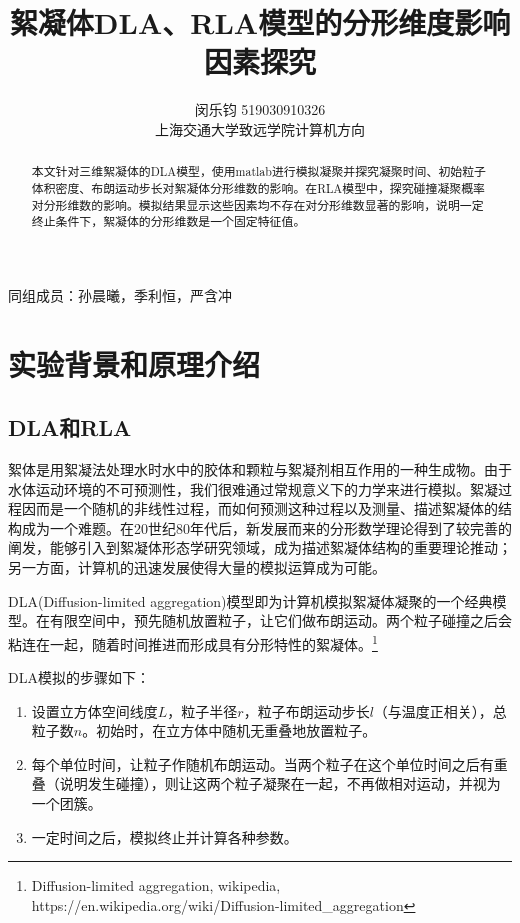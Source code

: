 \documentclass[lang=cn,11pt,a4paper,cite=authoryear]{elegantpaper}
\title{絮凝体DLA、RLA模型的分形维度影响因素探究}
\author{闵乐钧 519030910326\\ 上海交通大学致远学院计算机方向}
\date{\zhtoday}
\begin{document}
\maketitle

\begin{center}
    同组成员：孙晨曦，季利恒，严含冲
\end{center}

\begin{abstract}
本文针对三维絮凝体的DLA模型，使用matlab进行模拟凝聚并探究凝聚时间、初始粒子体积密度、布朗运动步长对絮凝体分形维数的影响。在RLA模型中，探究碰撞凝聚概率对分形维数的影响。模拟结果显示这些因素均不存在对分形维数显著的影响，说明一定终止条件下，絮凝体的分形维数是一个固定特征值。
\end{abstract}

\section{实验背景和原理介绍}

\subsection{DLA和RLA}
絮体是用絮凝法处理水时水中的胶体和颗粒与絮凝剂相互作用的一种生成物。由于水体运动环境的不可预测性，我们很难通过常规意义下的力学来进行模拟。絮凝过程因而是一个随机的非线性过程，而如何预测这种过程以及测量、描述絮凝体的结构成为一个难题。在20世纪80年代后，新发展而来的分形数学理论得到了较完善的阐发，能够引入到絮凝体形态学研究领域，成为描述絮凝体结构的重要理论推动；另一方面，计算机的迅速发展使得大量的模拟运算成为可能。

DLA(Diffusion-limited aggregation)模型即为计算机模拟絮凝体凝聚的一个经典模型。在有限空间中，预先随机放置粒子，让它们做布朗运动。两个粒子碰撞之后会粘连在一起，随着时间推进而形成具有分形特性的絮凝体。\footnote{Diffusion-limited aggregation, wikipedia, https://en.wikipedia.org/wiki/Diffusion-limited\_aggregation}

DLA模拟的步骤如下：
\begin{enumerate}
    \item 设置立方体空间线度$L$，粒子半径$r$，粒子布朗运动步长$l$（与温度正相关），总粒子数$n$。初始时，在立方体中随机无重叠地放置粒子。
    \item 每个单位时间，让粒子作随机布朗运动。当两个粒子在这个单位时间之后有重叠（说明发生碰撞），则让这两个粒子凝聚在一起，不再做相对运动，并视为一个团簇。
    \item 一定时间之后，模拟终止并计算各种参数。
\end{enumerate}
\end{document}
